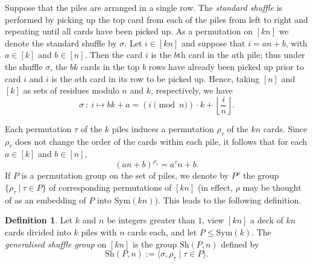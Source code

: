 \documentclass[12pt]{amsart}
\theoremstyle{remark}
\theoremstyle{definition}
\newtheorem{defn}[thm]{Definition}
\newcommand{\sym}{\mathrm{Sym}}
\newcommand{\sh}{\mathrm{Sh}}
\begin{document}
Suppose that the piles are arranged in a single row. The \emph{standard shuffle} is performed by picking up the top card from each of the piles from left to right and repeating until all cards have been picked up. As a permutation on $[kn]$ we denote the standard shuffle by $\sigma$. Let $i \in [kn]$ and suppose that $i = an + b$, with $a \in [k]$ and $b \in [n]$. Then the card $i$ is the $b$th card in the $a$th pile; thus under the shuffle $\sigma$, the $bk$ cards in the top $b$ rows have already been picked up prior to card $i$ and $i$ is the $a$th card in its row to be picked up. Hence, taking $[n]$ and $[k]$ as sets of residues modulo $n$ and $k$, respectively, we have
	\begin{equation} \label{eq: s}
	\sigma \ : \ i \mapsto bk + a = (i \pmod{n}) \cdot k + \left\lfloor \frac{i}{n} \right\rfloor.
	\end{equation}

Each permutation $\tau$ of the $k$ piles induces a permutation $\rho_\tau$ of the $kn$ cards. Since $\rho_\tau$ does not change the order of the cards within each pile, it follows that for each $a \in [k]$ and $b \in [n]$,
	\begin{equation} \label{eq: rho}
	(an+b)^{\rho_\tau} = a^\tau n + b.
	\end{equation}
If $P$ is a permutation group on the set of piles, we denote by $P^\rho$ the group $\{ \rho_\tau \ | \ \tau \in P \}$ of corresponding permutations of $[kn]$ (in effect, $\rho$ may be thought of as an embedding of $P$ into $\sym(kn)$).
This leads to the following definition.

\begin{defn}\label{def:sh}
Let $k$ and $n$ be integers greater than $1$, view $[kn]$ a deck of $kn$ cards divided into $k$ piles with $n$ cards each, and let $P \leqslant \sym(k)$. The \emph{generalised shuffle group} on $[kn]$ is the group $\sh(P,n)$ defined by
	\[ \sh(P,n):= \langle \sigma, \rho_\tau \mid \tau \in P \rangle. \]
\end{defn}
\end{document}
